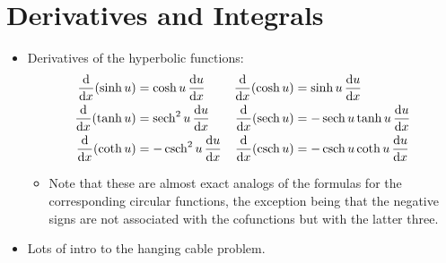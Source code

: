 \documentclass[../main.tex]{subfiles}
\begin{document}
\section{Derivatives and Integrals}
\begin{itemize}
    \item {}Derivatives of the hyperbolic functions:
    \begin{align*}
        \dv{x}(\sinh u) &= \cosh u\, \dv{u}{x}&
        \dv{x}(\cosh u) &= \sinh u\, \dv{u}{x}\\
        \dv{x}(\tanh u) &= \sech^2 u\, \dv{u}{x}&
        \dv{x}(\sech u) &= -\sech u\tanh u\, \dv{u}{x}\\
        \dv{x}(\coth u) &= -\csch^2 u\, \dv{u}{x}&
        \dv{x}(\csch u) &= -\csch u\coth u\, \dv{u}{x}
    \end{align*}
    \begin{itemize}
        \item Note that these are almost exact analogs of the formulas for the corresponding circular functions, the exception being that the negative signs are not associated with the cofunctions but with the latter three.
    \end{itemize}
    \item Lots of intro to the hanging cable problem.
\end{itemize}
\end{document}
